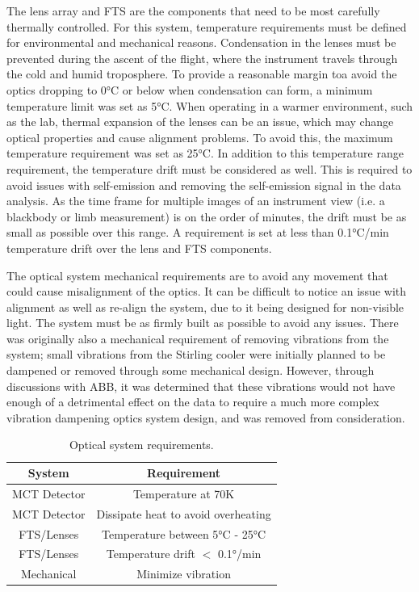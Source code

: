 The lens array and FTS are the components that need to be most carefully thermally controlled. For this system, temperature requirements must be defined for environmental and mechanical reasons. Condensation in the lenses must be prevented during the ascent of the flight, where the instrument travels through the cold and humid troposphere. To provide a reasonable margin toa avoid the optics dropping to 0°C or below when condensation can form, a minimum temperature limit was set as 5°C. When operating in a warmer environment, such as the lab, thermal expansion of the lenses can be an issue, which may change optical properties and cause alignment problems. To avoid this, the maximum temperature requirement was set as 25°C. In addition to this temperature range requirement, the temperature drift must be considered as well. This is required to avoid issues with self-emission and removing the self-emission signal in the data analysis. As the time frame for multiple images of an instrument view (i.e. a blackbody or limb measurement) is on the order of minutes, the drift must be as small as possible over this range. A requirement is set at less than 0.1°C/min temperature drift over the lens and FTS components. 

The optical system mechanical requirements are to avoid any movement that could cause misalignment of the optics. It can be difficult to notice an issue with alignment as well as re-align the system, due to it being designed for non-visible light. The system must be as firmly built as possible to avoid any issues. There was originally also a mechanical requirement of removing vibrations from the system; small vibrations from the Stirling cooler were initially planned to be dampened or removed through some mechanical design. However, through discussions with ABB, it was determined that these vibrations would not have enough of a detrimental effect on the data to require a much more complex vibration dampening optics system design, and was removed from consideration.

\begin{table}[h]
\begin{center}
\begin{tabular}{ |c|c| }
 \hline
 \rowcolor{lightgray}
 System & Requirement\\
  \hline
  \hline
  MCT Detector & Temperature at 70K\\
 \hline
  MCT Detector & Dissipate heat to avoid overheating\\
 \hline
 FTS/Lenses & Temperature between 5°C - 25°C\\
 \hline
 FTS/Lenses & Temperature drift $<$ 0.1°/min\\
 \hline
 Mechanical & Minimize vibration\\
 \hline
\end{tabular}
\end{center}
\caption{Optical system requirements.}
 \label{optics_req_table}
\end{table}

